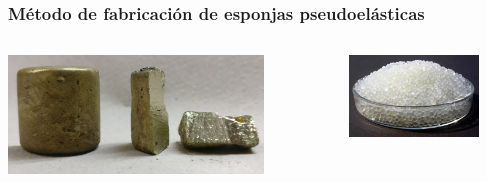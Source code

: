 \documentclass[usenames,dvipsnames]{beamer}
\begin{document}
\begin{frame}
\frametitle{Método de fabricación de esponjas pseudoelásticas}

\begin{columns}
\includegraphics[width=0.8\textwidth]{img/proceso/lingote.jpg}

\includegraphics[width=0.8\textwidth]{img/proceso/silica.jpg}



\end{columns}
\end{frame}
\end{document}
